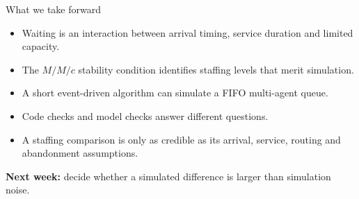 \documentclass{beamer}
\begin{document}
\begin{frame}{What we take forward}
  \begin{itemize}
    \item Waiting is an interaction between arrival timing, service duration and limited capacity.
    \item The $M/M/c$ stability condition identifies staffing levels that merit simulation.
    \item A short event-driven algorithm can simulate a FIFO multi-agent queue.
    \item Code checks and model checks answer different questions.
    \item A staffing comparison is only as credible as its arrival, service, routing and abandonment assumptions.
  \end{itemize}
  \vspace{0.5em}
  \textbf{Next week:} decide whether a simulated difference is larger than simulation noise.
\end{frame}
\end{document}
